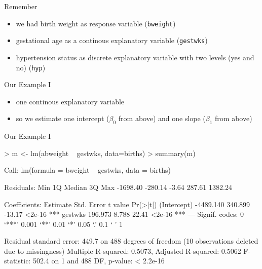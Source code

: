 \begin{frame}{Remember}
  \begin{itemize}
  \item we had birth weight as response variable (\texttt{bweight})
  \item gestational age as a continous explanatory variable (\texttt{gestwks})
  \item hypertension status as discrete explanatory variable with two levels (yes and no) (\texttt{hyp})
  \end{itemize}
\end{frame}

\begin{frame}{Our Example I}
  \begin{itemize}
  \item one continous explanatory variable
  \item so we estimate one intercept ($\beta_0$ from above) and one slope ($\beta_1$ from above)
  \end{itemize}
\end{frame}

\begin{frame}[fragile]{Our Example I}\scriptsize
\begin{semiverbatim}
> m <- lm(abweight ~ gestwks, data=births)
> summary(m)

Call:
lm(formula = bweight ~ gestwks, data = births)

Residuals:
     Min       1Q   Median       3Q      Max 
-1698.40  -280.14    -3.64   287.61  1382.24 

Coefficients:
             Estimate Std. Error t value Pr(>|t|)    
(Intercept) -4489.140    340.899  -13.17   <2e-16 ***
gestwks       196.973      8.788   22.41   <2e-16 ***
---
Signif. codes:  0 ‘***’ 0.001 ‘**’ 0.01 ‘*’ 0.05 ‘.’ 0.1 ‘ ’ 1 

Residual standard error: 449.7 on 488 degrees of freedom
  (10 observations deleted due to missingness)
Multiple R-squared: 0.5073,	Adjusted R-squared: 0.5062 
F-statistic: 502.4 on 1 and 488 DF,  p-value: < 2.2e-16 
\end{semiverbatim}      
\end{frame}

